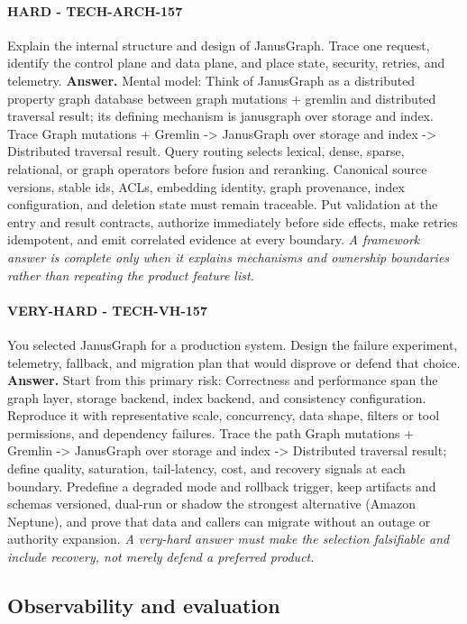 \paragraph{HARD - TECH-ARCH-157} Explain the internal structure and design of JanusGraph. Trace one request, identify the control plane and data plane, and place state, security, retries, and telemetry.
\textbf{Answer.} Mental model: Think of JanusGraph as a distributed property graph database between graph mutations + gremlin and distributed traversal result; its defining mechanism is janusgraph over storage and index. Trace Graph mutations + Gremlin -> JanusGraph over storage and index -> Distributed traversal result. Query routing selects lexical, dense, sparse, relational, or graph operators before fusion and reranking. Canonical source versions, stable ids, ACLs, embedding identity, graph provenance, index configuration, and deletion state must remain traceable. Put validation at the entry and result contracts, authorize immediately before side effects, make retries idempotent, and emit correlated evidence at every boundary.
\textit{A framework answer is complete only when it explains mechanisms and ownership boundaries rather than repeating the product feature list.}
\paragraph{VERY-HARD - TECH-VH-157} You selected JanusGraph for a production system. Design the failure experiment, telemetry, fallback, and migration plan that would disprove or defend that choice.
\textbf{Answer.} Start from this primary risk: Correctness and performance span the graph layer, storage backend, index backend, and consistency configuration. Reproduce it with representative scale, concurrency, data shape, filters or tool permissions, and dependency failures. Trace the path Graph mutations + Gremlin -> JanusGraph over storage and index -> Distributed traversal result; define quality, saturation, tail-latency, cost, and recovery signals at each boundary. Predefine a degraded mode and rollback trigger, keep artifacts and schemas versioned, dual-run or shadow the strongest alternative (Amazon Neptune), and prove that data and callers can migrate without an outage or authority expansion.
\textit{A very-hard answer must make the selection falsifiable and include recovery, not merely defend a preferred product.}
\subsection{Observability and evaluation}

